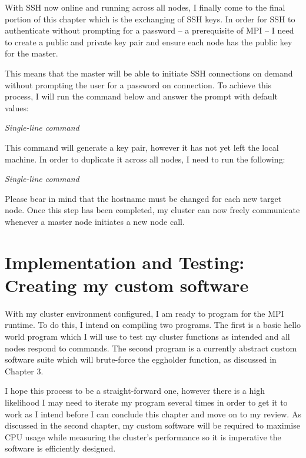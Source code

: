 \textbf{}

With SSH now online and running across all nodes, I finally come to the final portion of this chapter which is  the exchanging of SSH keys. In order for SSH to authenticate without prompting for a password -- a prerequisite of MPI -- I need to create a public and private key pair and ensure each node has the public key for the master.

This means that the master will be able to initiate SSH connections on demand without prompting the user for a password on connection. To achieve this process, I will run the command below and answer the prompt with default values:


\begin{center}
    \emph{Single-line command}
\end{center}

This command will generate a key pair, however it has not yet left the local machine. In order to duplicate it across all nodes, I need to run the following:


\begin{center}
    \emph{Single-line command}
\end{center}

Please bear in mind that the hostname must be changed for each new target node. Once this step has been completed, my cluster can now freely communicate whenever a master node initiates a new node call.
\vfill\break

\section{Implementation and Testing: Creating my custom software}
With my cluster environment configured, I am ready to program for the MPI runtime. To do this, I intend on compiling two programs. The first is a basic hello world program \cite{barrett_et_al_2006} which I will use to test my cluster functions as intended and all nodes respond to commands. The second program is a currently abstract custom software suite which will brute-force the eggholder function, as discussed in Chapter 3.

I hope this process to be a straight-forward one, however there is a high likelihood I may need to iterate my program several times in order to get it to work as I intend before I can conclude this chapter and move on to my review. As discussed in the second chapter, my custom software will be required to maximise CPU usage while measuring the cluster's performance so it is imperative the software is efficiently designed.

